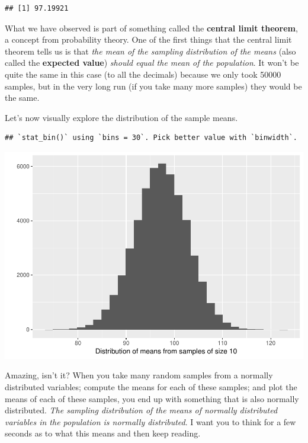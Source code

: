 \documentclass[]{book}
\newenvironment{Shaded}{\begin{snugshade}}{\end{snugshade}}
\newcommand{\CommentTok}[1]{\textcolor[rgb]{0.56,0.35,0.01}{\textit{#1}}}
\newcommand{\DataTypeTok}[1]{\textcolor[rgb]{0.13,0.29,0.53}{#1}}
\newcommand{\DecValTok}[1]{\textcolor[rgb]{0.00,0.00,0.81}{#1}}
\newcommand{\KeywordTok}[1]{\textcolor[rgb]{0.13,0.29,0.53}{\textbf{#1}}}
\newcommand{\NormalTok}[1]{#1}
\newcommand{\OperatorTok}[1]{\textcolor[rgb]{0.81,0.36,0.00}{\textbf{#1}}}
\newcommand{\StringTok}[1]{\textcolor[rgb]{0.31,0.60,0.02}{#1}}
\theoremstyle{definition}
\theoremstyle{definition}
\theoremstyle{definition}
\theoremstyle{remark}
\begin{document}
\begin{verbatim}
## [1] 97.19921
\end{verbatim}

What we have observed is part of something called the \textbf{central
limit theorem}, a concept from probability theory. One of the first
things that the central limit theorem tells us is that \emph{the mean of
the sampling distribution of the means} (also called the
\textbf{expected value}) \emph{should equal the mean of the population}.
It won't be quite the same in this case (to all the decimals) because we
only took 50000 samples, but in the very long run (if you take many more
samples) they would be the same.

Let's now visually explore the distribution of the sample means.

\begin{Shaded}
\end{Shaded}

\begin{verbatim}
## `stat_bin()` using `bins = 30`. Pick better value with `binwidth`.
\end{verbatim}

\includegraphics{05-inference_files/figure-latex/unnamed-chunk-14-1.pdf}

Amazing, isn't it? When you take many random samples from a normally
distributed variables; compute the means for each of these samples; and
plot the means of each of these samples, you end up with something that
is also normally distributed. \emph{The sampling distribution of the
means of normally distributed variables in the population is normally
distributed}. I want you to think for a few seconds as to what this
means and then keep reading.
\end{document}
